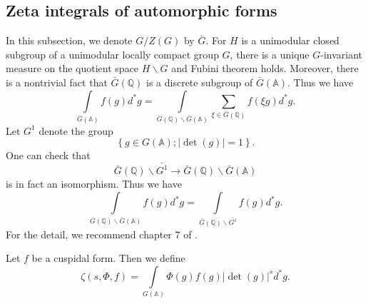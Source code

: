 \subsection{Zeta integrals of automorphic forms}
In this subsection, we denote $G/Z(G)$ by $\overline G$. 
For $H$ is a unimodular closed subgroup of a unimodular locally compact group $G$, there is a unique $G$-invariant measure on the quotient space $H\backslash G$ and Fubini theorem holds. 
Moreover, there is a nontrivial fact that $\bar G(\mathbb Q)$ is a discrete subgroup of $\bar G(\mathbb A)$. Thus we have 
\begin{equation}\label{im2}
\int\limits_{\bar G(\mathbb A)} f(g) d^*g=\int\limits_{\bar G(\mathbb Q)\backslash \bar G(\mathbb A)} \sum\limits_{\xi \in \bar G(\mathbb Q)} f(\xi g) d^*g.
\end{equation}
Let $G^1$ denote the group
\[
\left \{ g\in G(\mathbb A); \left  | \det(g)\right | =1 \right \}.
\]
One can check that 
\[
\bar G(\mathbb Q)\backslash \bar {G^1}\to \bar G(\mathbb Q)\backslash \bar G(\mathbb A)
\]
is in fact an isomorphism. Thus we have 
\begin{equation}\label{im}
\int\limits_{\bar G(\mathbb Q)\backslash \bar G(\mathbb A)} f(g) d^* g=
\int\limits_{\bar G(\mathbb Q)\backslash \bar {G^1}} f(g) d^* g.
\end{equation}
For the detail, we recommend chapter 7 of .


\begin{definition}
Let $f$ be a cuspidal form. Then we define
\[
\zeta(s,\Phi,f)=\int\limits_{G(\mathbb A)} \Phi(g) f(g) \left |\det (g) \right |^s d^*g.
\]
\end{definition}



